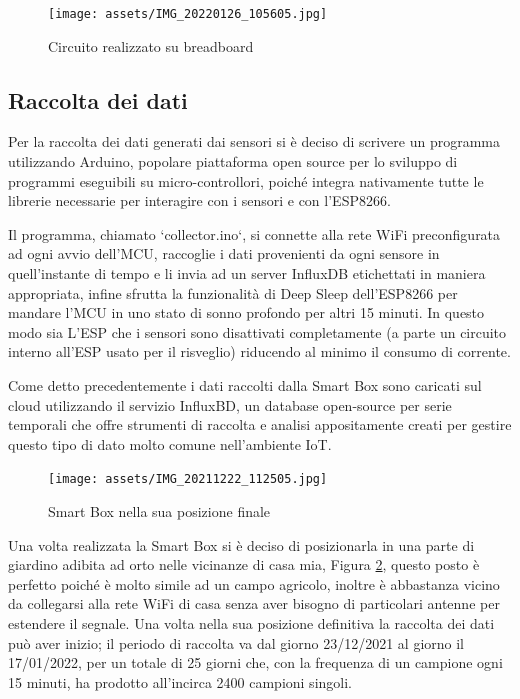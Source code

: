 \documentclass[a4paper, 12pt]{report}
\begin{document}
\begin{figure}[htbp]
\centering
\texttt{[image: assets/IMG\_20220126\_105605.jpg]}
\caption{Circuito realizzato su breadboard}
\label{fig:assembled}
\end{figure}

\subsection*{Raccolta dei dati}
\vspace{0.5cm}

Per la raccolta dei dati generati dai sensori si è deciso di scrivere un programma utilizzando Arduino\cite{arduino}, popolare piattaforma open source per lo sviluppo di programmi eseguibili su micro-controllori, poiché 
integra nativamente tutte le librerie necessarie per interagire con i sensori e con l'ESP8266. 

Il programma, chiamato `collector.ino`, si connette alla rete WiFi preconfigurata ad ogni avvio dell'MCU, raccoglie i dati provenienti da ogni sensore in quell'instante di tempo e li invia ad un server InfluxDB\cite{influxdb} 
etichettati in maniera appropriata, infine sfrutta la funzionalità di Deep Sleep dell'ESP8266 per mandare l'MCU in uno stato di sonno profondo per altri 15 minuti. In questo modo sia L'ESP che i sensori sono 
disattivati completamente (a parte un circuito interno all'ESP usato per il risveglio) riducendo al minimo il consumo di corrente.

Come detto precedentemente i dati raccolti dalla Smart Box sono caricati sul cloud utilizzando il servizio InfluxBD, un database open-source per serie temporali che offre strumenti di raccolta e analisi appositamente 
creati per gestire questo tipo di dato molto comune nell'ambiente IoT.

\begin{figure}[htbp]
\centering
\texttt{[image: assets/IMG\_20211222\_112505.jpg]}
\caption{Smart Box nella sua posizione finale}
\label{fig:inplace}
\end{figure}

Una volta realizzata la Smart Box si è deciso di posizionarla in una parte di giardino adibita ad orto nelle vicinanze di casa mia, Figura \ref{fig:inplace}, questo posto è perfetto poiché è molto simile ad un campo agricolo, 
inoltre è abbastanza vicino da collegarsi alla rete WiFi di casa senza aver bisogno di particolari antenne per estendere il segnale. 
Una volta nella sua posizione definitiva la raccolta dei dati può aver inizio; il periodo di raccolta va dal giorno 23/12/2021 al giorno il 17/01/2022, per un totale di 25 giorni che, con la frequenza di un campione 
ogni 15 minuti, ha prodotto all'incirca 2400 campioni singoli.
\end{document}
